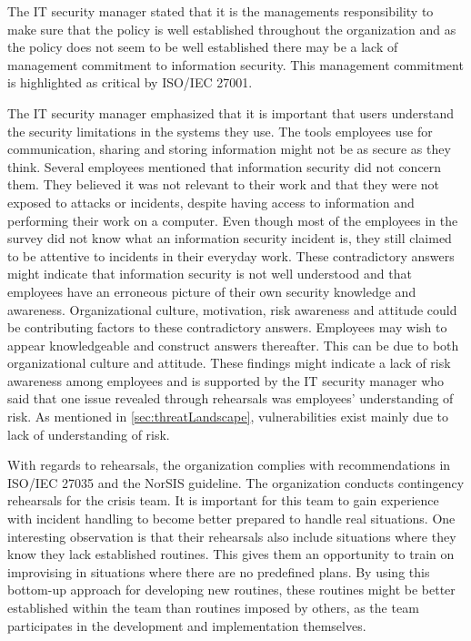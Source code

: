 The IT security manager stated that it is the managements responsibility to make sure that the policy is well established throughout the organization and as the policy does not seem to be well established there may be a lack of management commitment to information security. This management commitment is highlighted as critical by ISO/IEC 27001. 

The IT security manager emphasized that it is important that users understand the security limitations in the systems they use. The tools employees use for communication, sharing and storing information might not be as secure as they think. Several employees mentioned that information security did not concern them. They believed it was not relevant to their work and that they were not exposed to attacks or incidents, despite having access to information and performing their work on a computer. Even though most of the employees in the survey did not know what an information security incident is, they still claimed to be attentive to incidents in their everyday work. These contradictory answers might indicate that information security is not well understood and that employees have an erroneous picture of their own security knowledge and awareness. Organizational culture, motivation, risk awareness and attitude could be contributing factors to these contradictory answers. Employees may wish to appear knowledgeable and construct answers thereafter. This can be due to both organizational culture and attitude. These findings might indicate a lack of risk awareness among employees and is supported by the IT security manager who said that one issue revealed through rehearsals was employees' understanding of risk. As mentioned in \ref{sec:threatLandscape}, vulnerabilities exist mainly due to lack of understanding of risk.

With regards to rehearsals, the organization complies with recommendations in ISO/IEC 27035 and the NorSIS guideline. The organization conducts contingency rehearsals for the crisis team. It is important for this team to gain experience with incident handling to become better prepared to handle real situations. One interesting observation is that their rehearsals also include situations where they know they lack established routines. This gives them an opportunity to train on improvising in situations where there are no predefined plans. By using this bottom-up approach for developing new routines, these routines might be better established within the team than routines imposed by others, as the team participates in the development and implementation themselves.

